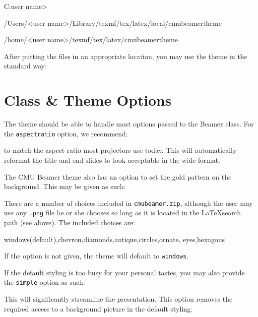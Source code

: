 \documentclass[11pt]{article}
\newcommand{\zip}{\lstinline[basicstyle=\ttfamily]!cmubeamer.zip!}
\begin{document}
\begin{tex}
C:\Users\<user name>\texmf\tex\latex\local\cmubeamertheme

/Users/<user name>/Library/texmf/tex/latex/local/cmubeamertheme

/home/<user name>/texmf/tex/latex/cmubeamertheme
\end{tex}

After putting the files in an appropriate location, you may use the theme in the standard way:


\section{Class \& Theme Options}

The theme should be able to handle most options passed to the Beamer class.  For the \lstinline[basicstyle=\ttfamily]!aspectratio! option, we recommend:
to match the aspect ratio most projectors use today.  This will automatically reformat the title and end slides to look acceptable in the wide format.

The CMU Beamer theme also has an option to set the gold pattern on the background.  This may be given as such:
\begin{tex}
\end{tex}
There are a number of choices included in \zip, although the user may use any \lstinline[basicstyle=\ttfamily]!.png! file he or she chooses so long as it is located in the \LaTeX search path (see above).  The included choices are:
\begin{tex}
windows(default),chevron,diamonds,antique,circles,ornate,
eyes,hexagons
\end{tex}
If the option is not given, the theme will default to \lstinline[basicstyle=\ttfamily]!windows!.

If the default styling is too busy for your personal tastes, you may also provide the \lstinline[basicstyle=\ttfamily]!simple! option as such:
\begin{tex}
\end{tex}
This will significantly streamline the presentation.  This option removes the required access to a background picture in the default styling.
\end{document}
